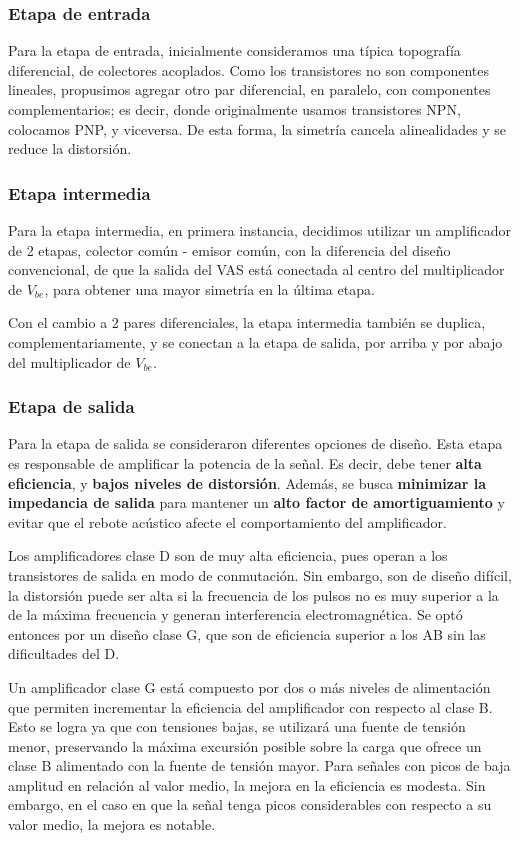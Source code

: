 \documentclass[a4paper,12pt,twoside]{article}
\begin{document}
\subsubsection{Etapa de entrada}
Para la etapa de entrada, inicialmente consideramos una típica topografía diferencial, de colectores acoplados. Como los transistores no son componentes lineales, propusimos agregar otro par diferencial, en paralelo, con componentes complementarios; es decir, donde originalmente usamos transistores NPN, colocamos PNP, y viceversa. De esta forma, la simetría cancela alinealidades y se reduce la distorsión. 

\subsubsection{Etapa intermedia}
Para la etapa intermedia, en primera instancia, decidimos utilizar un amplificador de 2 etapas, colector común - emisor común, con la diferencia del diseño convencional, de que la salida del VAS está conectada al centro del multiplicador de $V_{be}$, para obtener una mayor simetría en la última etapa.

Con el cambio a 2 pares diferenciales, la etapa intermedia también se duplica, complementariamente, y se conectan a la etapa de salida, por arriba y por abajo del multiplicador de $V_{be}$.

\subsubsection{Etapa de salida}
Para la etapa de salida se consideraron diferentes opciones de diseño. Esta etapa es responsable de amplificar la potencia de la señal. Es decir, debe tener \textbf{alta eficiencia}, y \textbf{bajos niveles de distorsión}. Además, se busca \textbf{minimizar la impedancia de salida} para mantener un \textbf{alto factor de amortiguamiento} y evitar que el rebote acústico afecte el comportamiento del amplificador. 

Los amplificadores clase D son de muy alta eficiencia, pues operan a los transistores de salida en modo de conmutación. Sin embargo, son de diseño difícil, la distorsión puede ser alta si la frecuencia de los pulsos no es muy superior a la de la máxima frecuencia y generan interferencia electromagnética. Se optó entonces por un diseño clase G, que son de eficiencia superior a los AB sin las dificultades del D. 

Un amplificador clase G está compuesto por dos o más niveles de alimentación que permiten incrementar la eficiencia del amplificador con respecto al clase B. Esto se logra ya que con tensiones bajas, se utilizará una fuente de tensión menor, preservando la máxima excursión posible sobre la carga que ofrece un clase B alimentado con la fuente de tensión mayor. Para señales con picos de baja amplitud en relación al valor medio, la mejora en la eficiencia es modesta. Sin embargo, en el caso en que la señal tenga picos considerables con respecto a su valor medio, la mejora es notable.
\end{document}
